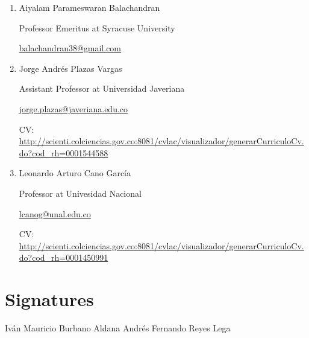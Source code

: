 \documentclass{article}
\begin{document}
\begin{enumerate}

\item Aiyalam Parameswaran Balachandran

Professor Emeritus at Syracuse University

\href{mailto:balachandran38@gmail.com}{balachandran38@gmail.com}

\item Jorge Andrés Plazas Vargas

Assistant Professor at Universidad Javeriana

\href{mailto:jorge.plazas@javeriana.edu.co}
{jorge.plazas@javeriana.edu.co}

CV: \url{http://scienti.colciencias.gov.co:8081/cvlac/visualizador/generarCurriculoCv.do?cod_rh=0001544588}

\item Leonardo Arturo Cano García 

Professor at Univesidad Nacional

\href{mailto:lcanog@unal.edu.co}{lcanog@unal.edu.co}

CV: \url{http://scienti.colciencias.gov.co:8081/cvlac/visualizador/generarCurriculoCv.do?cod_rh=0001450991}

\end{enumerate}

\section*{Signatures}

\vspace{2cm}

Iván Mauricio Burbano Aldana \hspace{2cm} Andrés Fernando Reyes Lega 



\end{document}
